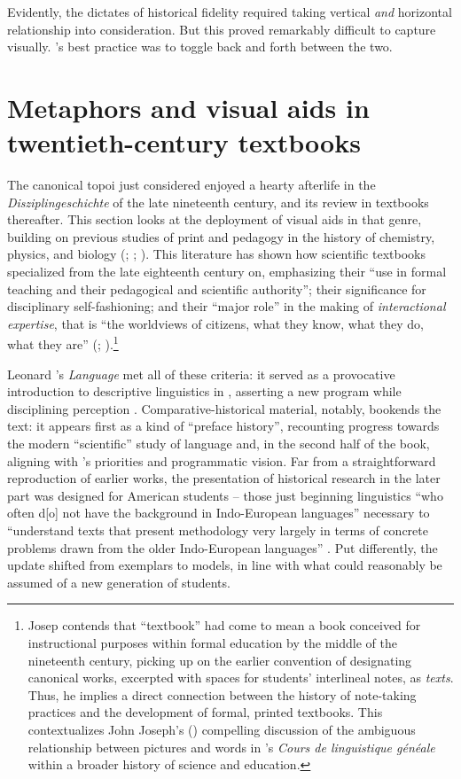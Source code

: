 \documentclass[output=paper]{langscibook}
\begin{document}
Evidently, the dictates of historical fidelity required taking vertical \emph{and} horizontal relationship into consideration. But this proved remarkably difficult to capture visually. {}'s best practice was to toggle back and forth between the two.

\section{Metaphors and visual aids in twentieth-century textbooks}
\label{sec:kaplan:textbooks}

The canonical topoi just considered enjoyed a hearty afterlife in the \emph{Disziplin\-geschichte} of the late nineteenth century, and its review in textbooks thereafter. This section looks at the deployment of visual aids in that genre, building on previous studies of print and pedagogy in the history of chemistry, physics, and biology (\citealt{bertomeusanchez2002}; \citealt{Kuhn1962}; \citealt{Hopwood2015}). This literature has shown how scientific textbooks specialized from the late eighteenth century on, emphasizing their ``use in formal teaching and their pedagogical and scientific authority''; their significance for disciplinary self-fashioning; and their ``major role'' in the making of \emph{interactional expertise}, that is ``the worldviews of citizens, what they know, what they do, what they are'' (\citealt[475, 479]{Simon2016}; \citealt[406--408]{Johns1998}).\footnote{Josep \citet{Simon2016} contends that ``textbook'' had come to mean a book conceived for instructional purposes within formal education by the middle of the nineteenth century, picking up on the earlier convention of designating canonical works, excerpted with spaces for students' interlineal notes, as \emph{texts}. Thus, he implies a direct connection between the history of note-taking practices and the development of formal, printed textbooks. This contextualizes John Joseph's (\citeyear{Joseph2017}) compelling discussion of the ambiguous relationship between pictures and words in {\Saussure}'s \emph{Cours de linguistique généale} within a broader history of science and education.}

Leonard {\Bloomfield}'s \emph{Language} met all of these criteria: it served as a provocative introduction to descriptive linguistics in \citeyear{Bloomfield1933}, asserting a new program while disciplining perception \citep[v-vi]{BloomfieldHoijer1965}. Comparative-historical material, notably, bookends the text: it appears first as a kind of ``preface history'', recounting progress towards the modern ``scientific'' study of language and, in the second half of the book, aligning with {\Bloomfield}'s priorities and programmatic vision. Far from a straightforward reproduction of earlier works, the presentation of historical research in the later part was designed for American students -- those just beginning linguistics ``who often d[o] not have the background in Indo-European languages'' necessary to ``understand texts that present methodology very largely in terms of concrete problems drawn from the older Indo-European languages'' \citep[vi]{BloomfieldHoijer1965}. Put differently, the update shifted from exemplars to models, in line with what could reasonably be assumed of a new generation of students.
\end{document}
